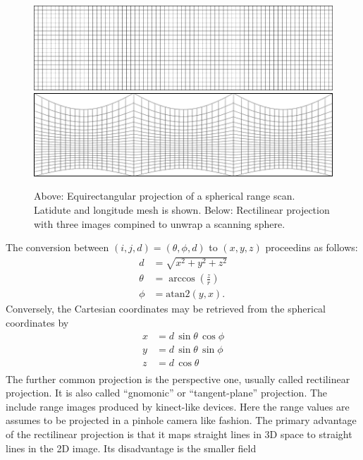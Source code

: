\documentclass[twocolumn,oneside]{book}
\begin{document}
%
\begin{figure}
  \includegraphics[width=\linewidth]{BOOKFIGS/EQprojection-mesh}\\[1ex]
  \includegraphics[width=\linewidth]{BOOKFIGS/REprojection-mesh}
  \caption{Above: Equirectangular projection of a spherical range
    scan.  Latidute and longitude mesh is shown. Below: Rectilinear
    projection with three images compined to unwrap a scanning
    sphere.}
\label{llmap}
\end{figure}
The conversion between $(i,j,d) = (\theta, \phi, d)$ to $(x,y,z)$
proceedins as follows:
\begin{align*}
  d    &= \sqrt{x^2+y^2+z^2} \\
\theta &= \arccos \left(\frac{z}{r}\right) \\
\phi   &= \text{atan2} \left(y, x \right). 
\end{align*}
Conversely, the Cartesian coordinates may be retrieved from the
spherical coordinates by
\begin{align*}
    x &= d \, \sin \theta \, \cos \phi \\
    y &= d \, \sin \theta \, \sin \phi \\
    z &= d \, \cos \theta \\
\end{align*}
%
The further common projection is the perspective one, usually called
rectilinear projection. It is also called ``gnomonic'' or
``tangent-plane'' projection. The include range images produced by
kinect-like devices. Here the range values are assumes to be projected
in a pinhole camera like fashion. The primary advantage of the
rectilinear projection is that it maps straight lines in 3D space to
straight lines in the 2D image. Its disadvantage is the smaller field
\end{document}
